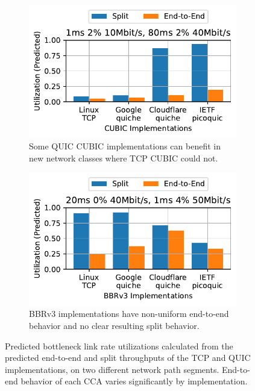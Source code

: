 \begin{figure}[t!]
    \centering
    \begin{subfigure}[b]{0.49\linewidth}
        \centering
        \includegraphics[width=\linewidth]
         {splitting/figures/network_path_analysis_10_40_1_80_2_2.pdf}
        \captionsetup{skip=0pt}
        \caption{Some QUIC CUBIC implementations can benefit in new network
         classes where TCP CUBIC could not.}
        \label{fig:splitting:quic-predictions:cubic}
    \end{subfigure}
    \begin{subfigure}[b]{0.49\linewidth}
        \centering
        \includegraphics[width=\linewidth]
         {splitting/figures/network_path_analysis_40_50_20_1_0_4.pdf}
        \captionsetup{skip=0pt}
        \caption{BBRv3 implementations have non-uniform end-to-end
         behavior and no clear resulting split behavior.}
        \label{fig:splitting:quic-predictions:bbr3}
    \end{subfigure}
    \caption{Predicted bottleneck link rate utilizations calculated from the
     predicted end-to-end and split throughputs of the TCP and QUIC
     implementations, on two different network path segments. End-to-end
     behavior of each CCA varies significantly by implementation.}
    \label{fig:splitting:quic-predictions}
\end{figure}
